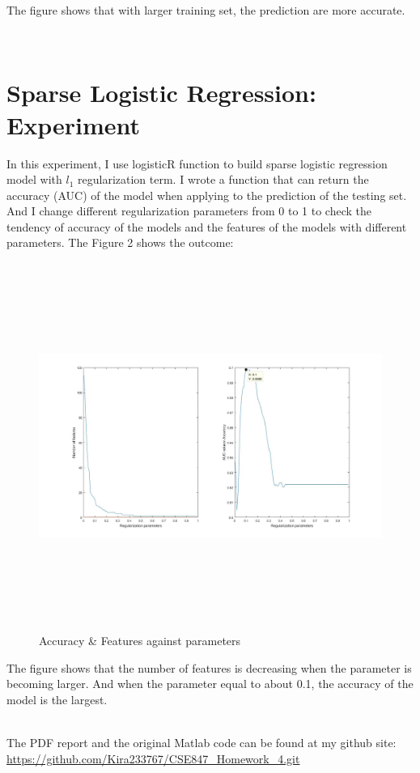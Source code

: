 \documentclass[letterpaper,12pt]{article}
\begin{document}
The figure shows that with larger training set, the prediction are more accurate.

\quad \\

\section{Sparse Logistic Regression: Experiment}
In this experiment, I use logisticR function to build sparse logistic regression model with $l_1$ regularization term. I wrote a function that can return the accuracy (AUC) of the model when applying to the prediction of the testing set. And I change different regularization parameters from 0 to 1 to check the tendency of accuracy of the models and the features of the models with different parameters. The Figure 2 shows the outcome:
\begin{center}
\begin{figure}[H]
\includegraphics[width = 17cm, height = 12cm]{"Figure2.jpg"}
\caption{Accuracy \& Features against parameters}
\end{figure}
\end{center}
The figure shows that the number of features is decreasing when the parameter is becoming larger. And when the parameter equal to about 0.1, the accuracy of the model is the largest.


\quad
\\



The PDF report and the original Matlab code can be found at my github site:   
\url{https://github.com/Kira233767/CSE847_Homework_4.git}
\end{document}
